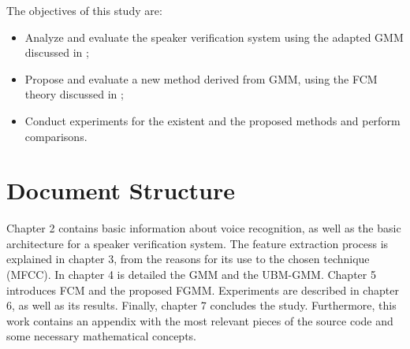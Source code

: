 The objectives of this study are:

\begin{itemize}\itemsep0pt
    \item Analyze and evaluate the speaker verification system using the adapted GMM discussed in \cite{reynolds.quatieri.dunn.2000};
    \item Propose and evaluate a new method derived from GMM, using the FCM theory discussed in \cite{gao.zhou.pu.2013};
    \item Conduct experiments for the existent and the proposed methods and perform comparisons.
\end{itemize}

\section{Document Structure}

Chapter 2 contains basic information about voice recognition, as well as the basic architecture for a speaker verification system. The feature extraction process is explained in chapter 3, from the reasons for its use to the chosen technique (MFCC). In chapter 4 is detailed the GMM and the UBM-GMM. Chapter 5 introduces FCM and the proposed FGMM. Experiments are described in chapter 6, as well as its results. Finally, chapter 7 concludes the study. Furthermore, this work contains an appendix with the most relevant pieces of the source code and some necessary mathematical concepts.